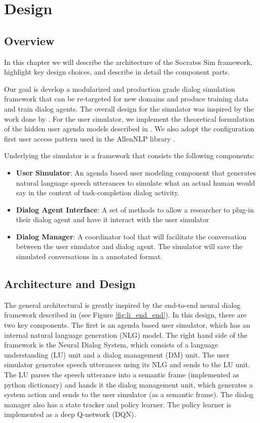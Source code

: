 \chapter{Design}
\label{chap:design}

\section{Overview}
\label{sec:designintroduction}

In this chapter we will describe the architecture of the Socrates Sim framework, highlight key design choices, and describe in detail the component parts. 

Our goal is develop a modularized and production grade dialog simulation framework that can be re-targeted for new domains and produce training data and train dialog agents. The overall design for the simulator was inspired by the work done by \cite{li_usersim}. For the user simulator, we implement the theoretical formulation of the hidden user agenda models described in \cite{Schatzmann2009TheHA}. We also adopt the configuration first user access pattern used in the AllenNLP library \cite{Gardner_allennlp}.

Underlying the simulator is a framework that consists the following components:
\begin{itemize}
	\item \textbf{User Simulator}: An agenda based user modeling component that generates natural language speech utterances to simulate what an actual human would say in the context of task-completion dialog activity. 
	\item \textbf{Dialog Agent Interface}: A set of methods to allow a researcher to plug-in their dialog agent and have it interact with the user simulator
	\item \textbf{Dialog Manager}: A coordinator tool that will facilitate the conversation between the user simulator and dialog agent. The simulator will save the simulated conversations in a annotated format.
\end{itemize}

\section{Architecture and Design} 

The general architectural is greatly inspired by the end-to-end neural dialog framework described in \cite{li_end_to_end}  (see Figure \ref{fig:li_end_end}). In this design, there are two key components. The first is an agenda based user simulator, which has an internal natural language generation (NLG) model. The right hand side of the framework is the Neural Dialog System, which consists of a language understanding (LU) unit and a dialog management (DM) unit. The user simulator generates speech utterances using its NLG and sends to the LU unit. The LU parses the speech utterance into a semantic frame (implemented as python dictionary) and hands it the dialog management unit, which generates a system action and sends to the user simulator (as a semantic frame). The dialog manager also has a state tracker and policy learner. The policy learner is implemented as a deep Q-network (DQN). 


